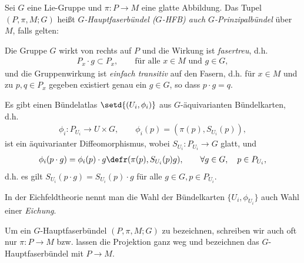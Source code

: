 \documentclass[%
	paper=a5,%
	fleqn,%
	DIV=18,%
	BCOR=0mm,
	fontsize=11pt,
	titlepage=false,%
	bibliography=totoc,
	DIV=18,%
	twoside=true,
	pdftitle=Riemannsche Geometrie,
	pdfauthor=Uwe Semmelmann,
	numbers=noendperiod]%
	{scrbook}
\begin{document}
\begin{defn}
Sei $G$ eine Lie-Gruppe und $\pi: P\to M$ eine glatte Abbildung. Das Tupel
$(P,\pi,M;G)$ heißt \emph{$G$-Hauptfaserbündel ($G$-HFB) auch
$G$-Prinzipalbündel} über $M$, falls gelten:
\begin{defnenum}
  \item Die Gruppe $G$ wirkt von rechts auf $P$ und die Wirkung ist \emph{fasertreu},
  d.h.
  \begin{align*}
  P_x\cdot g \subset P_x,\qquad \text{für alle }x\in M\text{ und }g\in G,
  \end{align*}
  und die Gruppenwirkung ist \emph{einfach transitiv} auf den Fasern, d.h. für
  $x\in M$ und zu $p,q\in P_x$ gegeben existiert genau ein $g\in G$, so dass
  $p\cdot g = q$.
  \item Es gibt einen Bündelatlas $\setd{(U_i,\phi_i)}$ aus $G$-äquivarianten
  Bündelkarten, d.h.
  \begin{align*}
  \phi_i : P_{U_i}\to U\times G,\qquad
  \phi_i(p) = (\pi(p),S_{U_i}(p)),
  \end{align*}
  ist ein äquivarianter  Diffeomorphismus, wobei $S_{U_i}: P_{U_i}\to G$ glatt, und
  \begin{align*}
  \phi_i(p\cdot g) = \phi_i(p)\cdot g \defr (\pi(p),S_{U_i}(p)g),\qquad \forall g\in
  G,\quad p\in P_{U_i},
  \end{align*}
  d.h. es gilt $S_{U_i}(p\cdot g) = S_{U_i}(p) \cdot g$ für alle $g \in G, p \in P_{U_i}$. \fish
\end{defnenum}
\end{defn}

In der Eichfeldtheorie nennt man die Wahl der Bündelkarten $\{U_i, \phi_{U_i}\}$ auch Wahl
einer \emph{Eichung}.

\begin{rem}[Notation.]
Um ein $G$-Hauptfaserbündel $(P,\pi,M;G)$ zu bezeichnen, schreiben wir auch oft
nur $\pi: P\to M$ bzw. lassen die Projektion ganz weg und bezeichnen das
$G$-Hauptfaserbündel mit $P\to M$.\map
\end{rem}
\end{document}
